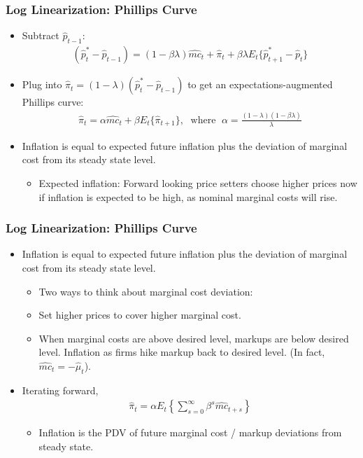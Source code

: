 \documentclass[11pt,aspectratio=169,xcolor={dvipsnames},hyperref={pdftex,pdfpagemode=UseNone,hidelinks,pdfdisplaydoctitle=true},usepdftitle=false]{beamer}
\begin{document}
\begin{frame}
\frametitle{Log Linearization: Phillips Curve
}
\begin{itemize}
	\item Subtract $\hat{p}_{t-1}$:
	\begin{align*}
		(\hat{p}_t^*-\hat{p}_{t-1})=(1-\beta\lambda)\hat{mc}_{t}+\hat{\pi}_t+\beta\lambda E_t\{\hat{p}_{t+1}^*-\hat{p}_{t}\}
	\end{align*}
	\pause
	\item Plug into $\hat{\pi}_t=(1-\lambda)(\hat{p}_t^*-\hat{p}_{t-1})$ to get an expectations-augmented Phillips curve:
	\begin{align*}
		\hat{\pi}_t=\alpha\hat{mc}_{t}+\beta E_t\{\hat{\pi}_{t+1}\},\;\text{ where }\;\alpha=\frac{(1-\lambda)(1-\beta\lambda)}{\lambda}
	\end{align*}
	\pause
	\item Inflation is equal to expected future inflation plus the deviation of marginal cost from its steady state level.
	\begin{itemize}
		\item Expected inflation: Forward looking price setters choose higher prices now if inflation is expected to be high, as nominal marginal costs will rise.
	\end{itemize}
\end{itemize}
\end{frame}


\begin{frame}
\frametitle{Log Linearization: Phillips Curve
}
\begin{itemize}
	\item Inflation is equal to expected future inflation plus the deviation of marginal cost from its steady state level.
	\begin{itemize}
		\item Two ways to think about marginal cost deviation:
	\end{itemize}
	\begin{itemize}
		\item Set higher prices to cover higher marginal cost.
		\item When marginal costs are above desired level, markups are below desired level. Inflation as firms hike markup back to desired level. (In fact, $\hat{mc}_t = -\hat{\mu}_t$).
	\end{itemize}
	\item Iterating forward,
	\begin{align*}
		\hat{\pi}_t=\alpha E_t\left\{\sum_{s=0}^{\infty}\beta^s\hat{mc}_{t+s}\right\}
	\end{align*}
	\begin{itemize}
		\item Inflation is the PDV of future marginal cost / markup deviations from steady state.
	\end{itemize}
\end{itemize}
\end{frame}
\end{document}
